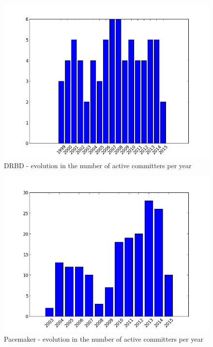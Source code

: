 \documentclass[a4paper, 12pt]{book}
\begin{document}
    \begin{figure}[H]
      \centering
      \includegraphics[scale=0.45]{barchart_d.png}
      \caption[Active committers for DRBD]{DRBD - evolution in the number of active committers per year}
      \label{fig:barchart_d}
    \end{figure}
    
    \begin{figure}[H]
      \centering
      \includegraphics[scale=0.45]{barchart_p.png}
      \caption[Active committers for Pacemaker]{Pacemaker - evolution in the number of active committers per year}
      \label{fig:barchart_p}
    \end{figure}
\end{document}
